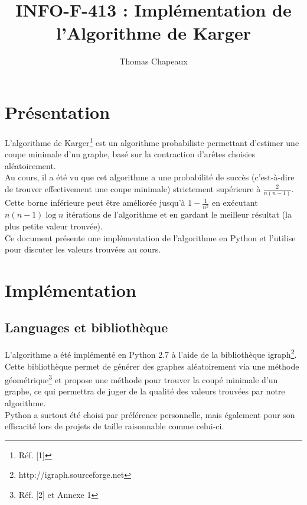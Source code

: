 \documentclass[a4paper,10pt]{article}
\title{INFO-F-413 : Implémentation de l'Algorithme de Karger}
\author{Thomas Chapeaux}
\begin{document}
\sloppy
\maketitle

\section{Présentation}

L'algorithme de 
Karger\footnote{Réf. [1]}
est un algorithme probabiliste permettant d'estimer une coupe minimale d'un graphe,
basé sur la contraction d'arêtes choisies aléatoirement.\\

Au cours, il a été vu que cet algorithme a une probabilité de succès (c'est-à-dire de trouver effectivement une coupe minimale) strictement supérieure à
\begin{math} \frac{2}{n(n-1)} \end{math}.
Cette borne inférieure peut être améliorée jusqu'à
\begin{math} 1- \frac{1}{n^{2}} \end{math} en exécutant
\begin{math} n(n-1)\log{n} \end{math} itérations de l'algorithme et en gardant le meilleur résultat (la plus petite valeur trouvée).\\

Ce document présente une implémentation de l'algorithme en Python et l'utilise pour discuter les valeurs trouvées au cours.\\

\section{Implémentation}

\subsection{Languages et bibliothèque}
L'algorithme a été implémenté en Python 2.7 à l'aide de la bibliothèque
igraph\footnote{http://igraph.sourceforge.net}.
Cette bibliothèque permet de générer des graphes aléatoirement via une méthode
géométrique\footnote{Réf. [2] et Annexe 1}
et propose une méthode pour trouver la coupé minimale d'un graphe, ce qui permettra de juger de la qualité des valeurs trouvées par notre algorithme.\\

Python a surtout été choisi par préférence personnelle, mais également pour son efficacité lors de projets de taille raisonnable comme celui-ci.\\
\end{document}
